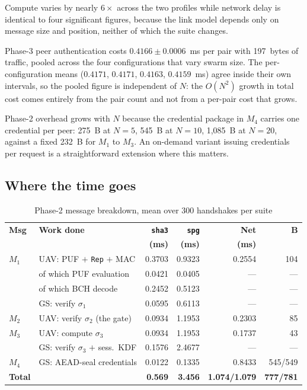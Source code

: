 \documentclass[conference]{IEEEtran}
\begin{document}
Compute varies by nearly $6\times$ across the two profiles while network delay
is identical to four significant figures, because the link model depends only on
message size and position, neither of which the suite changes.

Phase-3 peer authentication costs $0.4166 \pm 0.0006$~ms per pair with 197~bytes
of traffic, pooled across the four configurations that vary swarm size. The
per-configuration means ($0.4171$, $0.4171$, $0.4163$, $0.4159$~ms) agree inside
their own intervals, so the pooled figure is independent of $N$: the $O(N^2)$
growth in total cost comes entirely from the pair count and not from a per-pair
cost that grows.

Phase-2 overhead grows with $N$ because the credential package in $M_4$ carries
one credential per peer: 275~B at $N=5$, 545~B at $N=10$, 1{,}085~B at $N=20$,
against a fixed 232~B for $M_1$ to $M_3$. An on-demand variant issuing
credentials per request is a straightforward extension where this matters.

\subsection{Where the time goes}

\begin{table}[H]
\centering
\caption{Phase-2 message breakdown, mean over 300 handshakes per suite}
\label{tab:msg}
\scriptsize
\setlength{\tabcolsep}{2.4pt}
\begin{tabular}{@{}llrrrr@{}}
\toprule
\textbf{Msg} & \textbf{Work done} & \textbf{\texttt{sha3}} & \textbf{\texttt{spg}} &
\textbf{Net} & \textbf{B} \\
 & & \textbf{(ms)} & \textbf{(ms)} & \textbf{(ms)} & \\
\midrule
$M_1$ & UAV: PUF $+$ \texttt{Rep} $+$ MAC & 0.3703 & 0.9323 & 0.2554 & 104 \\
      & \quad of which PUF evaluation     & 0.0421 & 0.0405 & --- & --- \\
      & \quad of which BCH decode         & 0.2452 & 0.5123 & --- & --- \\
      & GS: verify $\sigma_1$             & 0.0595 & 0.6113 & --- & --- \\
$M_2$ & UAV: verify $\sigma_2$ (the gate) & 0.0934 & 1.1953 & 0.2303 & 85 \\
$M_3$ & UAV: compute $\sigma_3$           & 0.0934 & 1.1953 & 0.1737 & 43 \\
      & GS: verify $\sigma_3$ $+$ sess.\ KDF & 0.1576 & 2.4677 & --- & --- \\
$M_4$ & GS: AEAD-seal credentials         & 0.0122 & 0.1335 & 0.8433 & 545/549 \\
\midrule
\textbf{Total} & & \textbf{0.569} & \textbf{3.456} & \textbf{1.074/1.079} & \textbf{777/781} \\
\bottomrule
\end{tabular}
\end{table}
\end{document}
